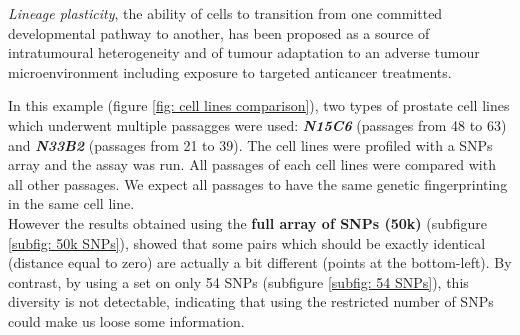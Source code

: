\textit{Lineage plasticity}, the ability of cells to transition from one
committed developmental pathway to another, has been proposed as a source of
intratumoural heterogeneity and of tumour adaptation to an adverse tumour
microenvironment including exposure to targeted anticancer treatments.

In this example (figure \ref{fig: cell lines comparison}), two types of prostate cell lines
which underwent multiple passagges were used: \textit{\textbf{N15C6}} (passages
from 48 to 63) and \textit{\textbf{N33B2}} (passages from 21 to 39). The cell
lines were profiled with a SNPs array and the assay was run. All passages of
each cell lines were compared with all other passages. We expect all passages to
have the same genetic fingerprinting in the same cell line.\\ 

However the results obtained using the \textbf{full array of SNPs (50k)}
(subfigure \ref{subfig: 50k SNPs}), showed that some pairs which should be
exactly identical (distance equal to zero) are actually a bit different 
(points at the bottom-left). By contrast, by using a set on only 54 SNPs
(subfigure \ref{subfig: 54 SNPs}), this diversity is not detectable, indicating
that using the restricted number of SNPs could make us loose some information. 

